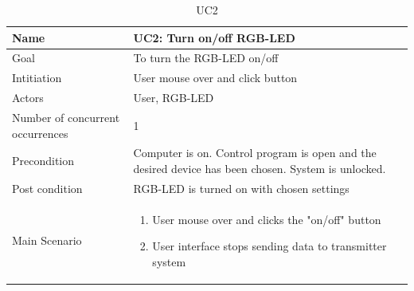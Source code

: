 \documentclass[oneside]{memoir}
\begin{document}
\begin{table}[]
\centering
\caption{UC2}
\label{my-label}
\begin{tabularx}{\textwidth}{|l X|}
\hline
Name                             & UC2: Turn on/off RGB-LED   \\ \hline
Goal                             & To turn the RGB-LED on/off    \\ \hline
Intitiation                      & User mouse over and click button          \\ \hline
Actors                           & User, RGB-LED                              \\ \hline
Number of concurrent occurrences & 1                                          \\ \hline
Precondition                     & Computer is on. Control program is open and the desired device
has been chosen. System is unlocked. \\ \hline
Post condition                   & RGB-LED is turned on with chosen settings  \\ \hline
Main Scenario                    & \begin{enumerate}
                                    \item User mouse over and clicks the "on/off" button
                                    \item User interface stops sending data to transmitter system
                                    \end{enumerate} \\ \hline
                                  
\end{tabularx}
\end{table}
\end{document}
